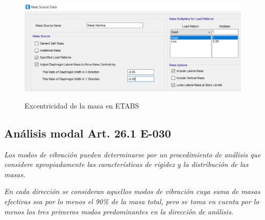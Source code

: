 \documentclass{article}%
\begin{document}
\begin{figure}[ht!]%
\centering%
\caption{Excentricidad de la masa en ETABS}%
\includegraphics[scale=0.7]{images/excentricidad.PNG}%
\label{masa}%
\end{figure}

%
\subsection{Análisis modal Art. 26.1 E-030}%
\label{subsec:AnlisismodalArt.26.1E{-}030}%
\begin{tcolorbox}[colback=gray!5!white,colframe=Maroon!75!black,fonttitle=\bfseries,title=Art. 26.1.1]%
\textit{Los modos de vibración pueden determinarse por un procedimiento de análisis que considere apropiadamente las características de rigidez y la distribución de las masas.}%
\end{tcolorbox}%
\begin{tcolorbox}[colback=gray!5!white,colframe=Maroon!75!black,fonttitle=\bfseries,title=Art. 29.1.2]%
\textit{En cada dirección se consideran aquellos modos de vibración cuya suma de masas efectivas sea por lo menos el 90\% de la masa total, pero se toma en cuenta por lo menos los tres primeros modos predominantes en la dirección de análisis.}%
\end{tcolorbox}%
\end{document}
